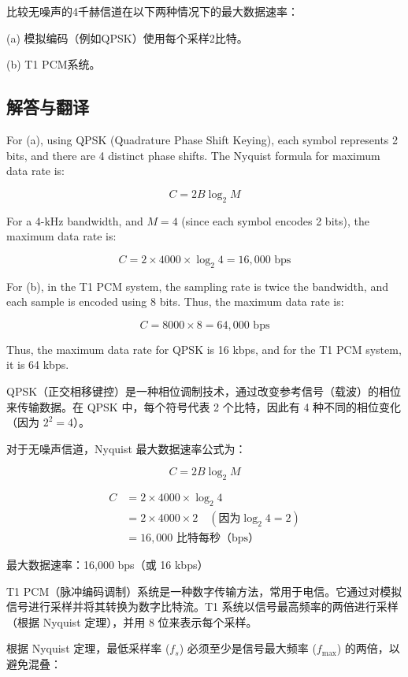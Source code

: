 比较无噪声的4千赫信道在以下两种情况下的最大数据速率：

(a) 模拟编码（例如QPSK）使用每个采样2比特。

(b) T1 PCM系统。

\subsection{解答与翻译}

For (a), using QPSK (Quadrature Phase Shift Keying), each symbol represents 2 bits, and there are 4 distinct phase shifts. The Nyquist formula for maximum data rate is:

\[
C = 2B \log_2 M
\]

For a 4-kHz bandwidth, and \(M = 4\) (since each symbol encodes 2 bits), the maximum data rate is:

\[
C = 2 \times 4000 \times \log_2 4 = 16,000 \text{ bps}
\]

For (b), in the T1 PCM system, the sampling rate is twice the bandwidth, and each sample is encoded using 8 bits. Thus, the maximum data rate is:

\[
C = 8000 \times 8 = 64,000 \text{ bps}
\]

Thus, the maximum data rate for QPSK is 16 kbps, and for the T1 PCM system, it is 64 kbps.

\vspace{10pt}

QPSK（正交相移键控）是一种相位调制技术，通过改变参考信号（载波）的相位来传输数据。在 QPSK 中，每个符号代表 2 个比特，因此有 4 种不同的相位变化（因为 \(2^2 = 4\)）。

对于无噪声信道，Nyquist 最大数据速率公式为：

\[
C = 2B \log_2 M
\]

\[
\begin{aligned}
C &= 2 \times 4000 \times \log_2 4 \\
  &= 2 \times 4000 \times 2 \quad (\text{因为} \log_2 4 = 2) \\
  &= 16,000 \text{ 比特每秒（bps）}
\end{aligned}
\]

最大数据速率：16,000 bps（或 16 kbps）


T1 PCM（脉冲编码调制）系统是一种数字传输方法，常用于电信。它通过对模拟信号进行采样并将其转换为数字比特流。T1 系统以信号最高频率的两倍进行采样（根据 Nyquist 定理），并用 8 位来表示每个采样。

根据 Nyquist 定理，最低采样率 (\(f_s\)) 必须至少是信号最大频率 (\(f_{\text{max}}\)) 的两倍，以避免混叠：

